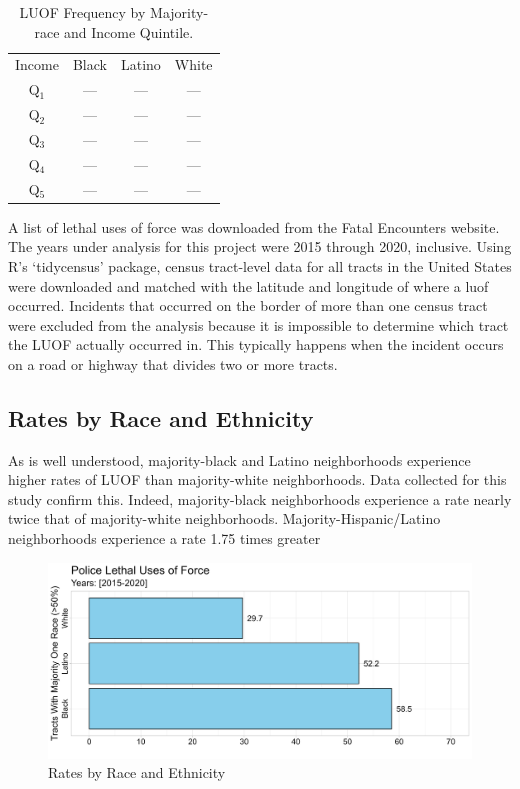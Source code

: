 \documentclass[12pt]{article}
\begin{document}
\begin{table}[h]
\centering
\begin{tabular}{cccc} %
Income&Black&Latino&White\\
Q$_1$ &---&---&---\\
Q$_2$ &---&---&---\\
Q$_3$ &---&---&---\\
Q$_4$ &---&---&---\\
Q$_5$ &---&---&---\\
\end{tabular}
  \captionsetup{justification=centering, singlelinecheck=false, margin=2cm}
  \caption[LUOF Frequency: Majority-race and Income Quintile]{LUOF Frequency by Majority-race and Income Quintile.}
  \label{tab:luof_freq_majority_quintile}
\end{table}

A list of lethal uses of force was downloaded from the Fatal Encounters website. The years under analysis for this project were 2015 through 2020, inclusive. Using R’s ‘tidycensus’ package, census tract-level data for all tracts in the United States were downloaded and matched with the latitude and longitude of where a \gls{luof} occurred. Incidents that occurred on the border of more than one census tract were excluded from the analysis because it is impossible to determine which tract the LUOF actually occurred in. This typically happens when the incident occurs on a road or highway that divides two or more tracts.

\subsection{Rates by Race and Ethnicity}

As is well understood, majority-black and Latino neighborhoods experience higher rates of LUOF than majority-white neighborhoods. Data collected for this study confirm this. Indeed, majority-black neighborhoods experience a rate nearly twice that of majority-white neighborhoods. Majority-Hispanic/Latino neighborhoods experience a rate 1.75 times greater

\begin{figure}[H]
  \centering %
  \includegraphics[width=\linewidth]{images/majority_race_only_ind}
  \captionsetup{justification=centering, margin=2cm}
  \caption[Rates by Race and Ethnicity]{Rates by Race and Ethnicity}
  \label{fig:race_ethnicity}
\end{figure}
\end{document}
